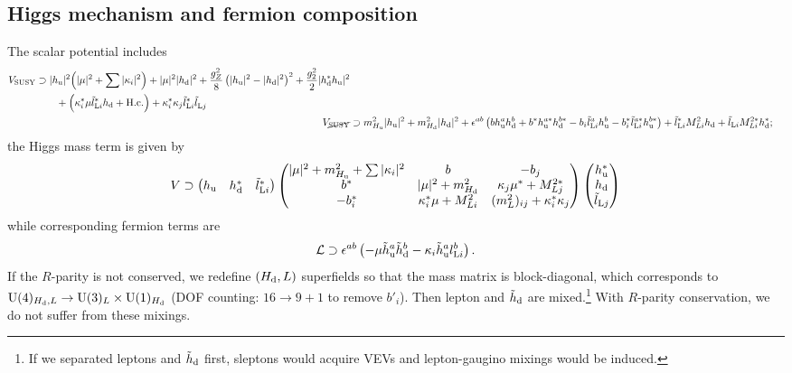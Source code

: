 \documentclass[CheatSheet]{subfiles}
\begin{document}
\subsection{Higgs mechanism and fermion composition}
The scalar potential includes
\begin{align}
\begin{split}
 V\w{SUSY}&\supset
 |\hu|^2\Bigl( |\mu|^2 + \sum|\kappa_i|^2 \Bigr)
 + |\mu|^2|\hd|^2
 + \frac{g_Z^2}{8}\left(|\hu|^2 - |\hd|^2\right)^2
 + \frac{g_2^2}{2}|\hd^{*}\hu|^2
\\&\qquad
 + \Bigl( \kappa^*_{i}\mu\tlL[i]^{*}\hd + \text{H.c.} \Bigr)
 + \kappa^{*}_{i}\kappa_{j}\tlL[i]^{*}\tlL[j]^{}
\end{split}
\\
V_{\text{\cancel{SUSY}}}&\supset
       m^2_{\Hu}|\hu|^2 + m^2_{\Hd}|\hd|^2 +\nep^{ab}\left(b\hu^a\hd^b + b^*\hu^{a*}\hd^{b*}
       -b_i\tlL[i]^a\hu^b-b_i^*\tlL[i]^{a*}\hu^{b*}\right)+\tlL[i]^*M^{2}_{Li}\hd + \tlL[i]M^{2*}_{Li}\hd^*;
\end{align}
the Higgs mass term is given by
\begin{equation}
 V\supset\pmat{\hu &\hd^* &\tlL[i]^*}
\pmat{
  |\mu|^2+m^2_{\Hu}+\sum|\kappa_i|^2 & b & -b_j\\
  b^* & |\mu|^2+m^2_{\Hd} & \kappa_j\mu^*+M^{2*}_{Lj}\\
  -b_i^* & \kappa_i^*\mu+M^{2}_{Li} & (m_L^2)_{ij} + \kappa_i^*\kappa_j
}
\pmat{\hu^* \\\hd\\\tlL[j]}
\end{equation}
while corresponding fermion terms are
\begin{equation}
 \mathcal L\supset \nep^{ab}\left(
  -\mu\thu^a\thd^b-\kappa_i\thu^a\lL[i]^b
\right).
\end{equation}
If the $R$-parity is not conserved, we redefine $(\Hd, L)$ superfields so that the mass matrix is block-diagonal, which corresponds to $\gU(4)_{\Hd,L}\to\gU(3)_L\times\gU(1)_{\Hd}$ (DOF counting: $16\to9+1$ to remove $b'_i$).
Then lepton and $\thd$ are mixed.\footnote{If we separated leptons and $\thd$ first, sleptons would acquire VEVs and lepton-gaugino mixings would be induced.}
With $R$-parity conservation, we do not suffer from these mixings.
\end{document}

